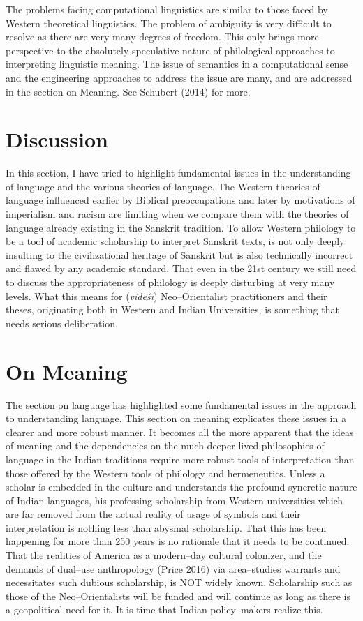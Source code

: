 The problems facing computational linguistics are similar to those faced by Western theoretical linguistics. The problem of ambiguity is very difficult to resolve as there are very many degrees of freedom. This only brings more perspective to the absolutely speculative nature of philological approaches to interpreting linguistic meaning. The issue of semantics in a computational sense and the engineering approaches to address the issue are many, and are addressed in the section on Meaning. See Schubert (2014) for more.


\section*{Discussion}

In this section, I have tried to highlight fundamental issues in the understanding of language and the various theories of language. The Western theories of language influenced earlier by Biblical preoccupations and later by motivations of imperialism and racism are limiting when we compare them with the theories of language already existing in the Sanskrit tradition. To allow Western philology to be a tool of academic scholarship to interpret Sanskrit texts, is not only deeply insulting to the civilizational heritage of Sanskrit but is also technically incorrect and flawed by any academic standard. That even in the 21st century we still need to discuss the appropriateness of philology is deeply disturbing at very many levels. What this means for (\textit{videśī}) Neo–Orientalist practitioners and their theses, originating both in Western and Indian Universities, is something that needs serious deliberation.

\newpage


\section*{On Meaning}

The section on language has highlighted some fundamental issues in the approach to understanding language. This section on meaning explicates these issues in a clearer and more robust manner. It becomes all the more apparent that the ideas of meaning and the dependencies on the much deeper lived philosophies of language in the Indian traditions require more robust tools of interpretation than those offered by the Western tools of philology and hermeneutics. Unless a scholar is embedded in the culture and understands the profound syncretic nature of Indian languages, his professing scholarship from Western universities which are far removed from the actual reality of usage of symbols and their interpretation is nothing less than abysmal scholarship. That this has been happening for more than 250 years is no rationale that it needs to be continued. That the realities of America as a modern–day cultural colonizer, and the demands of dual–use anthropology (Price 2016) via area–studies warrants and necessitates such dubious scholarship, is NOT widely known. Scholarship such as those of the Neo–Orientalists will be funded and will continue as long as there is a geopolitical need for it. It is time that Indian policy–makers realize this.


